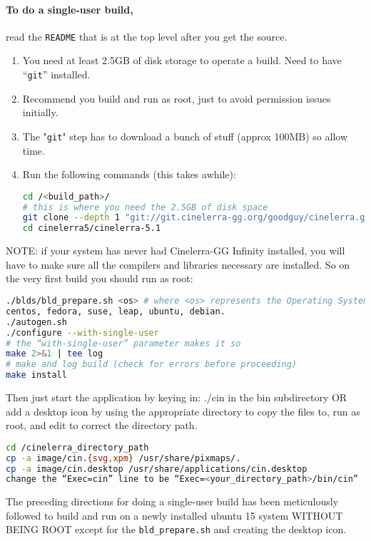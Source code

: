 \paragraph{To do a single-user build,} read the \texttt{README} that is at the top level after you get the source.
\begin{enumerate}
    \item  You need at least 2.5GB of disk storage to operate a build. Need to have “\texttt{git}” installed.
    \item  Recommend you build and run as root, just to avoid permission issues initially.
    \item  The "\texttt{git}" step has to download a bunch of stuff (approx 100MB) so allow time.
    \item  Run the following commands (this takes awhile):
        \begin{lstlisting}[language=bash]
cd /<build_path>/
# this is where you need the 2.5GB of disk space
git clone --depth 1 "git://git.cinelerra-gg.org/goodguy/cinelerra.git" cinelerra5
cd cinelerra5/cinelerra-5.1
        \end{lstlisting}
\end{enumerate}
NOTE: if your system has never had Cinelerra-GG Infinity installed, you will have to make sure all
the compilers and libraries necessary are installed. So on the very first build you should run as root:
\begin{lstlisting}[language=bash]
./blds/bld_prepare.sh <os> # where <os> represents the Operating System of
centos, fedora, suse, leap, ubuntu, debian.
./autogen.sh
./configure --with-single-user
# the “with-single-user” parameter makes it so
make 2>&1 | tee log
# make and log build (check for errors before proceeding)
make install
\end{lstlisting}

Then just start the application by keying in: ./cin in the bin subdirectory OR add a desktop icon by
using the appropriate directory to copy the files to, run as root, and edit to correct the directory path.
\begin{lstlisting}[language=bash]
cd /cinelerra_directory_path
cp -a image/cin.{svg,xpm} /usr/share/pixmaps/.
cp -a image/cin.desktop /usr/share/applications/cin.desktop
change the “Exec=cin” line to be “Exec=<your_directory_path>/bin/cin”
\end{lstlisting}
The preceding directions for doing a single-user build has been meticulously followed to build and run
on a newly installed ubuntu 15 system WITHOUT BEING ROOT except for the \texttt{bld\_prepare.sh} and creating the desktop icon.
